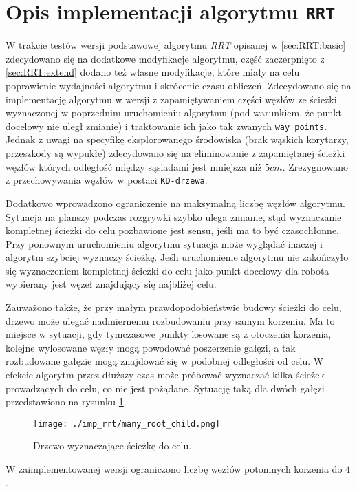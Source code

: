\section{Opis implementacji algorytmu \texttt{RRT} \label{sec:rrt_impl}}
W trakcie testów wersji podstawowej algorytmu \textit{RRT} opisanej w \ref{sec:RRT:basic} zdecydowano się na dodatkowe modyfikacje algorytmu, część zaczerpnięto z 
\ref{sec:RRT:extend} dodano też własne modyfikacje, które miały na celu poprawienie wydajności algorytmu i skrócenie czasu obliczeń.
Zdecydowano się na implementację algorytmu w wersji z zapamiętywaniem części węzłów ze ścieżki wyznaczonej w poprzednim uruchomieniu algorytmu (pod warunkiem, że punkt docelowy nie
uległ zmianie) i traktowanie ich jako tak zwanych \texttt{way points}. Jednak z uwagi na specyfikę eksplorowanego środowiska (brak wąskich korytarzy, przeszkody są wypukłe)
zdecydowano się na eliminowanie z zapamiętanej ścieżki węzłów których odległość między sąsiadami jest mniejsza niż $5cm$. Zrezygnowano z przechowywania węzłów w postaci \texttt{KD-drzewa}.

Dodatkowo wprowadzono ograniczenie na maksymalną liczbę węzłów algorytmu. Sytuacja na planszy podczas rozgrywki szybko ulega zmianie, stąd wyznaczanie kompletnej 
ścieżki do celu pozbawione jest sensu, jeśli ma to być czasochłonne. Przy ponownym uruchomieniu algorytmu sytuacja może wyglądać inaczej i algorytm szybciej wyznaczy ścieżkę.
Jeśli uruchomienie algorytmu nie zakończyło się wyznaczeniem kompletnej ścieżki do celu jako punkt docelowy dla robota wybierany jest węzeł znajdujący się najbliżej celu.

Zauważono także, że przy małym prawdopodobieństwie budowy ścieżki do celu, drzewo może ulegać nadmiernemu rozbudowaniu przy samym korzeniu. Ma to miejsce w sytuacji, gdy
tymczasowe punkty losowane są z otoczenia korzenia, kolejne wylosowane węzły mogą powodować poszerzenie gałęzi, a tak rozbudowane gałęzie mogą znajdować się w podobnej 
odległości od celu. W efekcie algorytm przez dłuższy czas może próbować wyznaczać kilka ścieżek prowadzących do celu, co nie jest pożądane. Sytuację taką dla dwóch gałęzi przedstawiono na rysunku \ref{fig:many_root_child}.
\begin{figure}[h]
\centering
\texttt{[image: ./imp\_rrt/many\_root\_child.png]}
\caption{ Drzewo wyznaczające ścieżkę do celu.} \label{fig:many_root_child}
\end{figure} 
W zaimplementowanej wersji ograniczono liczbę wezłów potomnych korzenia do $4$.

